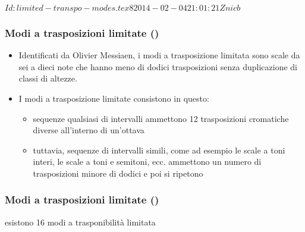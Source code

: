 %
%
\svnInfo $Id: limited-transpo-modes.tex 8 2014-02-04 21:01:21Z nicb $

\setcounter{ms}{0}
\begin{frame}
    \frametitle{Modi a trasposizioni limitate ()}

    \begin{itemize}

            \item Identificati da Olivier Messiaen, i modi a trasposizione limitata
                sono scale da sei a dieci note che hanno meno di dodici trasposizioni
                senza duplicazione di classi di altezze.

            \item I modi a trasposizione limitate consistono in questo:

            \begin{itemize}
                \item sequenze qualsiasi di intervalli ammettono
                    12 trasposizioni cromatiche diverse all'interno di un'ottava
                \item tuttavia, sequenze di intervalli simili, come ad esempio le scale a toni interi,
                    le scale a toni e semitoni, ecc.  ammettono un numero di trasposizioni
                    minore di dodici e poi si ripetono
            \end{itemize}

    \end{itemize}

\end{frame}

\begin{frame}
    \frametitle{Modi a trasposizioni limitate ()}

    \begin{center}
        \begin{figure}
            \caption{}
        \end{figure}
    \end{center}
    
    esistono 16 modi a trasponibilit\`a limitata

\end{frame}
